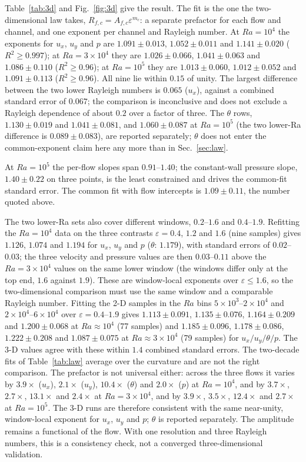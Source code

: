 \documentclass[preprint,11pt,a4paper,times]{elsarticle}
\begin{document}
Table~\ref{tab:3d} and Fig.~\ref{fig:3d} give the result. The fit is the one the two-dimensional
law takes, $R_{f,c}=A_{f,c}\varepsilon^{m_c}$: a separate prefactor for each flow and channel, and
one exponent per channel and Rayleigh number. At $Ra=10^4$ the exponents for $u_x$, $u_y$ and $p$
are $1.091\pm0.013$, $1.052\pm0.011$ and $1.141\pm0.020$ ($R^2\ge0.997$); at $Ra=3\times10^4$ they
are $1.026\pm0.066$, $1.041\pm0.063$ and $1.086\pm0.110$ ($R^2\ge0.96$); at $Ra=10^5$ they are
$1.013\pm0.060$, $1.012\pm0.052$ and $1.091\pm0.113$ ($R^2\ge0.96$). All nine lie within $0.15$
of unity. The largest difference between the two lower Rayleigh numbers is $0.065$ ($u_x$), against a
combined standard error of $0.067$; the comparison is inconclusive and does not exclude a Rayleigh
dependence of about $0.2$ over a factor of three. The $\theta$ rows, $1.130\pm0.019$ and
$1.041\pm0.081$, and $1.060\pm0.087$ at $Ra=10^5$ (the two lower-Ra difference is
$0.089\pm0.083$), are reported separately; $\theta$ does not enter the
common-exponent claim here any more than in Sec.~\ref{sec:law}.

At $Ra=10^5$ the per-flow slopes span $0.91$--$1.40$; the constant-wall pressure slope,
$1.40\pm0.22$ on three points, is the least constrained and drives the common-fit standard
error. The common fit with flow intercepts is $1.09\pm0.11$, the number quoted above.

The two lower-Ra sets also cover different windows, $0.2$--$1.6$ and $0.4$--$1.9$. Refitting the
$Ra=10^4$ data on the three contrasts $\varepsilon=0.4$, $1.2$ and $1.6$ (nine samples) gives
$1.126$, $1.074$ and $1.194$ for $u_x$, $u_y$ and $p$ ($\theta$: $1.179$), with standard errors of
$0.02$--$0.03$; the three velocity and pressure values are then $0.03$--$0.11$ above the
$Ra=3\times10^4$ values on the same lower window (the windows differ only at the top end, $1.6$
against $1.9$). These are window-local exponents over $\varepsilon\le1.6$, so the two-dimensional
comparison must use the same window and a comparable Rayleigh number. Fitting the 2-D samples in the $Ra$ bins
$5\times10^3$--$2\times10^4$ and $2\times10^4$--$6\times10^4$ over $\varepsilon=0.4$--$1.9$ gives $1.113\pm0.091$,
$1.135\pm0.076$, $1.164\pm0.209$ and $1.200\pm0.068$ at $Ra\approx10^4$ (77 samples) and
$1.185\pm0.096$, $1.178\pm0.086$, $1.222\pm0.208$ and $1.087\pm0.075$ at $Ra\approx3\times10^4$
(79 samples) for $u_x/u_y/\theta/p$. The 3-D values agree with these within $1.4$ combined standard errors. The two-decade fits of
Table~\ref{tab:law} average over the curvature and are not the right comparison. The prefactor is
not universal either: across the three flows it varies by $3.9\times$ ($u_x$), $2.1\times$ ($u_y$),
$10.4\times$ ($\theta$) and $2.0\times$ ($p$) at $Ra=10^4$, and by $3.7\times$, $2.7\times$,
$13.1\times$ and $2.4\times$ at $Ra=3\times10^4$, and by $3.9\times$, $3.5\times$,
$12.4\times$ and $2.7\times$ at $Ra=10^5$. The 3-D runs are therefore consistent with the same near-unity, window-local exponent for $u_x$,
$u_y$ and $p$; $\theta$ is reported separately. The amplitude remains a functional of the flow.
With one resolution and three Rayleigh numbers, this is a consistency check, not a converged
three-dimensional validation.
\end{document}
